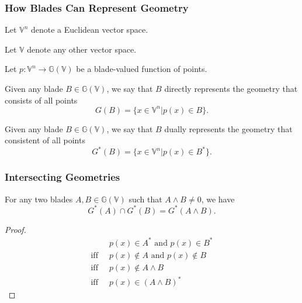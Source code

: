 \documentclass{beamer}
\newcommand{\G}{\mathbb{G}}
\newcommand{\V}{\mathbb{V}}
\begin{document}
\begin{frame}
\frametitle{How Blades Can Represent Geometry}
Let $\V^n$ denote a \alert{Euclidean} vector space.

Let $\V$ denote any other vector space.

Let $p:\V^n\to\G(\V)$ be a blade-valued function of points.
\begin{definition}
Given any blade $B\in\G(\V)$, we say that $B$ \alert{directly} represents
the geometry that consists of all points
\begin{equation*}
G(B) = \{x\in\V^n|p(x)\in B\}.
\end{equation*}
\end{definition}
\begin{definition}
Given any blade $B\in\G(\V)$, we say that $B$ \alert{dually} represents
the geometry that consistent of all points
\begin{equation*}
G^*(B) = \{x\in\V^n|p(x)\in B^*\}.
\end{equation*}
\end{definition}
\end{frame}

\begin{frame}
\frametitle{Intersecting Geometries}
\begin{lemma}
For any two blades $A,B\in\G(\V)$ such that $A\wedge B\neq 0$,
we have
\begin{equation*}
G^*(A)\cap G^*(B)=G^*(A\wedge B).
\end{equation*}
\end{lemma}
\begin{proof}
\begin{align*}
 & \mbox{$p(x)\in A^*$ and $p(x)\in B^*$} \\
\mbox{iff}\;\; & \mbox{$p(x)\not\in A$ and $p(x)\not\in B$} \\
\mbox{iff}\;\; & \mbox{$p(x)\not\in A\wedge B$} \\
\mbox{iff}\;\; & \mbox{$p(x)\in(A\wedge B)^*$}
\end{align*}
\end{proof}
\end{frame}
\end{document}
